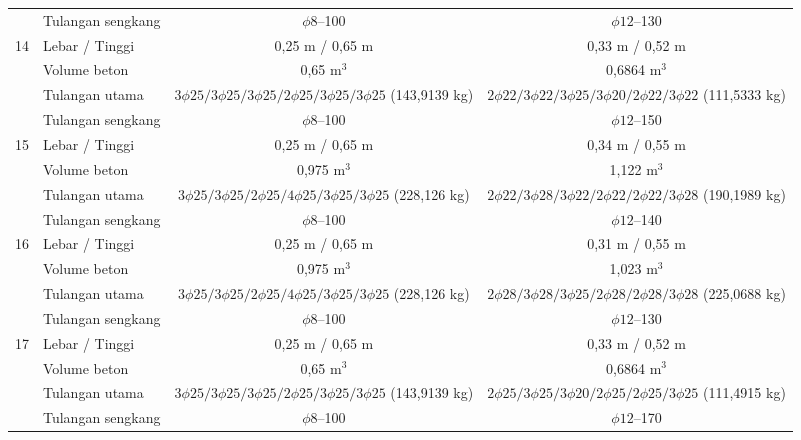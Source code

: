 \begin{landscape}
\begin{longtable}{clcccc}
   & Tulangan sengkang & \multicolumn{2}{c}{$\phi8$--100} & \multicolumn{2}{c}{$\phi12$--130} \\
14 & Lebar / Tinggi & \multicolumn{2}{c}{0,25 m / 0,65 m} & \multicolumn{2}{c}{0,33 m / 0,52 m} \\
   & Volume beton & \multicolumn{2}{c}{0,65 m$^3$} & \multicolumn{2}{c}{0,6864 m$^3$} \\
   & Tulangan utama & \multicolumn{2}{c}{$3\phi25/3\phi25/3\phi25/2\phi25/3\phi25/3\phi25$ (143,9139 kg)} & \multicolumn{2}{c}{$2\phi22/3\phi22/3\phi25/3\phi20/2\phi22/3\phi22$ (111,5333 kg)} \\
   & Tulangan sengkang & \multicolumn{2}{c}{$\phi8$--100} & \multicolumn{2}{c}{$\phi12$--150} \\
15 & Lebar / Tinggi & \multicolumn{2}{c}{0,25 m / 0,65 m} & \multicolumn{2}{c}{0,34 m / 0,55 m} \\
   & Volume beton & \multicolumn{2}{c}{0,975 m$^3$} & \multicolumn{2}{c}{1,122 m$^3$} \\
   & Tulangan utama & \multicolumn{2}{c}{$3\phi25/3\phi25/2\phi25/4\phi25/3\phi25/3\phi25$ (228,126 kg)} & \multicolumn{2}{c}{$2\phi22/3\phi28/3\phi22/2\phi22/2\phi22/3\phi28$ (190,1989 kg)} \\
   & Tulangan sengkang & \multicolumn{2}{c}{$\phi8$--100} & \multicolumn{2}{c}{$\phi12$--140} \\
16 & Lebar / Tinggi & \multicolumn{2}{c}{0,25 m / 0,65 m} & \multicolumn{2}{c}{0,31 m / 0,55 m} \\
   & Volume beton & \multicolumn{2}{c}{0,975 m$^3$} & \multicolumn{2}{c}{1,023 m$^3$} \\
   & Tulangan utama & \multicolumn{2}{c}{$3\phi25/3\phi25/2\phi25/4\phi25/3\phi25/3\phi25$ (228,126 kg)} & \multicolumn{2}{c}{$2\phi28/3\phi28/3\phi25/2\phi28/2\phi28/3\phi28$ (225,0688 kg)} \\
   & Tulangan sengkang & \multicolumn{2}{c}{$\phi8$--100} & \multicolumn{2}{c}{$\phi12$--130} \\
17 & Lebar / Tinggi & \multicolumn{2}{c}{0,25 m / 0,65 m} & \multicolumn{2}{c}{0,33 m / 0,52 m} \\
   & Volume beton & \multicolumn{2}{c}{0,65 m$^3$} & \multicolumn{2}{c}{0,6864 m$^3$} \\
   & Tulangan utama & \multicolumn{2}{c}{$3\phi25/3\phi25/3\phi25/2\phi25/3\phi25/3\phi25$ (143,9139 kg)} & \multicolumn{2}{c}{$2\phi25/3\phi25/3\phi20/2\phi25/2\phi25/3\phi25$ (111,4915 kg)} \\
   & Tulangan sengkang & \multicolumn{2}{c}{$\phi8$--100} & \multicolumn{2}{c}{$\phi12$--170} \\

\end{longtable}
\end{landscape}

